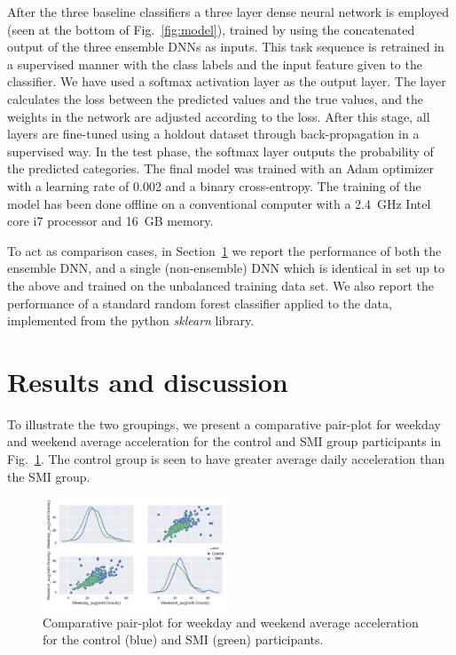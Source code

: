 \documentclass[letterpaper, 10pt, conference]{ieeeconf} %
\newcommand{\sect}[1]{Section~\ref{#1}}
\newcommand{\fig}[1]{Fig.~\ref{#1}}
\begin{document}
After the three baseline classifiers a three layer dense neural network is employed (seen at the bottom of \fig{fig:model}), trained by using the concatenated output of the three ensemble DNNs as inputs. This task sequence is retrained in a supervised manner with the class labels and the input feature given to the classifier. We have used a softmax activation layer as the output layer. The layer calculates the loss between the predicted values and the true values, and the weights in the network are adjusted according to the loss. After this stage, all layers are fine-tuned using a holdout dataset through back-propagation in a supervised way. In the test phase, the softmax layer outputs the probability of the predicted categories. The final model was trained with an Adam optimizer with a learning rate of 0.002 and a binary cross-entropy. The training of the model has been done offline on a conventional computer with a 2.4~GHz Intel core i7 processor and 16~GB memory.

To act as comparison cases, in \sect{sec:results} we report the performance of both the ensemble DNN, and a single (non-ensemble) DNN which is identical in set up to the above and trained on the unbalanced training data set. We also report the performance of a standard random forest classifier applied to the data, implemented from the python \emph{sklearn} library. 


\section{Results and discussion} \label{sec:results}
To illustrate the two groupings, we present a comparative pair-plot for weekday and weekend average acceleration for the control and SMI group participants in \fig{feat2}. The control group is seen to have greater average daily acceleration than the SMI group.
 \begin{figure}
    \centering
    \includegraphics[width=0.49\textwidth]{images/Figure_1.png}
    \caption{Comparative pair-plot for weekday and weekend average acceleration for the control (blue) and SMI (green) participants.} 
    \label{feat2}
  \end{figure} 
\end{document}
